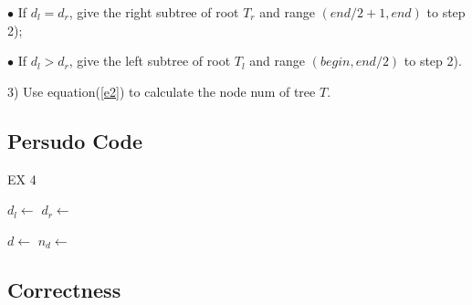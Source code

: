 \documentclass{article}
\begin{document}
    $\bullet$ If $d_{l} = d_{r}$, give the right subtree of root $T_{r}$ and range $(end / 2 + 1, end)$ to step 2);

    $\bullet$ If $d_{l} > d_{r}$, give the left subtree of root $T_{l}$ and range $(begin, end / 2)$ to step 2).

    3) Use equation(\ref{e2}) to calculate the node num of tree $T$.

    \subsection{Persudo Code}
    \begin{algorithm}[h]
        \large
        \caption{EX 4}
        \begin{algorithmic}[1]
                    \State {}
                \EndIf
                \State {}
            \EndFunction
                    \State {}
                \EndIf
                \State $d_{l} \gets $
                \State $d_{r} \gets $

                    \State {}
                    \State {}
                \EndIf
            \EndFunction

                \State $d \gets $
                \State $n_{d} \gets $
                \State {}
            \EndFunction
        \end{algorithmic}
    \end{algorithm}

    \subsection{Correctness}
\end{document}
